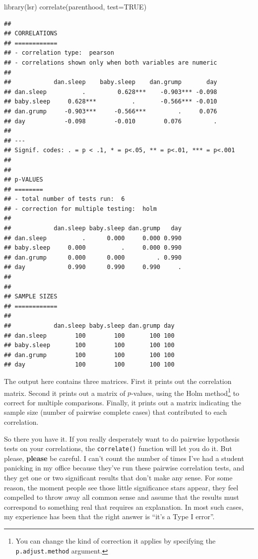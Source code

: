 \documentclass[
]{book}
\newenvironment{Shaded}{\begin{snugshade}}{\end{snugshade}}
\newcommand{\AttributeTok}[1]{\textcolor[rgb]{0.77,0.63,0.00}{#1}}
\newcommand{\ConstantTok}[1]{\textcolor[rgb]{0.00,0.00,0.00}{#1}}
\newcommand{\FunctionTok}[1]{\textcolor[rgb]{0.00,0.00,0.00}{#1}}
\newcommand{\NormalTok}[1]{#1}
\begin{document}
\begin{Shaded}
\begin{Highlighting}[]
\FunctionTok{library}\NormalTok{(lsr)}
\FunctionTok{correlate}\NormalTok{(parenthood, }\AttributeTok{test=}\ConstantTok{TRUE}\NormalTok{)}
\end{Highlighting}
\end{Shaded}

\begin{verbatim}
## 
## CORRELATIONS
## ============
## - correlation type:  pearson 
## - correlations shown only when both variables are numeric
## 
##            dan.sleep    baby.sleep    dan.grump       day   
## dan.sleep          .         0.628***    -0.903*** -0.098   
## baby.sleep     0.628***          .       -0.566*** -0.010   
## dan.grump     -0.903***     -0.566***         .     0.076   
## day           -0.098        -0.010        0.076         .   
## 
## ---
## Signif. codes: . = p < .1, * = p<.05, ** = p<.01, *** = p<.001
## 
## 
## p-VALUES
## ========
## - total number of tests run:  6 
## - correction for multiple testing:  holm 
## 
##            dan.sleep baby.sleep dan.grump   day
## dan.sleep          .      0.000     0.000 0.990
## baby.sleep     0.000          .     0.000 0.990
## dan.grump      0.000      0.000         . 0.990
## day            0.990      0.990     0.990     .
## 
## 
## SAMPLE SIZES
## ============
## 
##            dan.sleep baby.sleep dan.grump day
## dan.sleep        100        100       100 100
## baby.sleep       100        100       100 100
## dan.grump        100        100       100 100
## day              100        100       100 100
\end{verbatim}

The output here contains three matrices. First it prints out the correlation matrix. Second it prints out a matrix of \(p\)-values, using the Holm method\footnote{You can change the kind of correction it applies by specifying the \texttt{p.adjust.method} argument.} to correct for multiple comparisons. Finally, it prints out a matrix indicating the sample size (number of pairwise complete cases) that contributed to each correlation.

So there you have it. If you really desperately want to do pairwise hypothesis tests on your correlations, the \texttt{correlate()} function will let you do it. But please, \textbf{please} be careful. I can't count the number of times I've had a student panicking in my office because they've run these pairwise correlation tests, and they get one or two significant results that don't make any sense. For some reason, the moment people see those little significance stars appear, they feel compelled to throw away all common sense and assume that the results must correspond to something real that requires an explanation. In most such cases, my experience has been that the right answer is ``it's a Type I error''.
\end{document}
